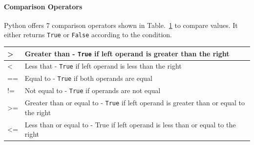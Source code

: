 \documentclass[../main.tex]{subfiles}
\begin{document}
\paragraph{Comparison Operators} Python offers 7 comparison operators shown in Table.~\ref{tab:comparison_operators} to compare values. It either returns \texttt{True} or \texttt{False} according to the condition. 

\begin{table}[h]
\begin{small}
\centering
\noindent{}
 \noindent \begin{tabular}{|p{}|p{}|}
 \hline
> & Greater than - \texttt{True} if left operand is greater than the right\\ \hline
< &	Less that - \texttt{True} if left operand is less than the right\\ \hline
== 	& Equal to - \texttt{True} if both operands are equal\\ \hline
!= &	Not equal to - \texttt{True} if operands are not equal\\ \hline
>= 	& Greater than or equal to - \texttt{True} if left operand is greater than or equal to the right\\ \hline
<= 	& Less than or equal to - True if left operand is less than or equal to the right\\ \hline
\end{tabular}
  \label{tab:comparison_operators}
  \end{small}
\end{table} 
\end{document}
